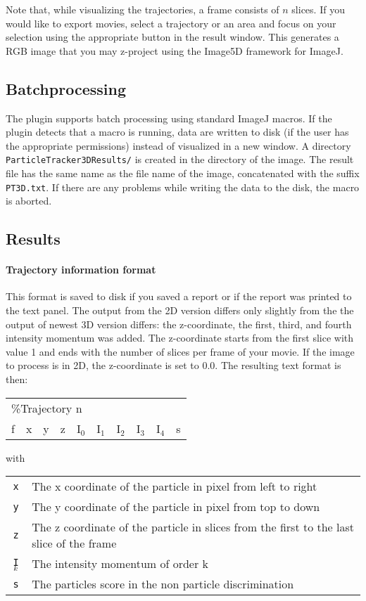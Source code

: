 \documentclass{scrartcl}
\begin{document}
Note that, while visualizing the trajectories, a frame consists of $n$ slices. If you would like to export movies, select a trajectory or an area and focus on your selection using the appropriate button in the result window. This generates  a RGB image that you may z-project using the Image5D framework for ImageJ.

\subsection{Batchprocessing}
The plugin supports batch processing using standard ImageJ macros. If the plugin detects that a macro is running, data are written to disk (if the user has the appropriate permissions) instead of visualized in a new window. A directory \texttt{ParticleTracker3DResults/} is created in the directory of the image. The result file has the same name as the file name of the image, concatenated with the suffix \texttt{PT3D.txt}. If there are any problems while writing the data to the disk, the macro is aborted.

\subsection{Results}
\label{sec:results}
\paragraph{Trajectory information format}
This format is saved to disk if you saved a report or if the report was printed to the text panel. The output from the 2D version differs only slightly from the the output of newest 3D version differs: the z-coordinate, the first, third, and fourth intensity momentum was added. The z-coordinate starts from the first slice with value 1 and ends with the number of slices per frame of your movie. If the image to process is in 2D, the z-coordinate is set to 0.0. The resulting text format is then:
\begin{table}[ht]
		\ttfamily
		\begin{tabular}{*{10}{l}}	
			\multicolumn{10}{l}{ \%Trajectory n} \\		
			f	&	x & y & z & I$_0$ & I$_1$ & I$_2$ & I$_3$ & I$_4$ & s					
		\end{tabular}
\end{table}

with
\begin{table}[ht]
	\centering
	\begin{tabular}{cp{10cm}}
		\texttt{x} & The x coordinate of the particle in pixel from left to right \\
		\texttt{y} & The y coordinate of the particle in pixel from top to down \\
		\texttt{z} & The z coordinate of the particle in slices from the first to the last slice of the frame\\
		\texttt{I}$_k$ & The intensity momentum of order k \\
		\texttt{s} & The particles score in the non particle discrimination \\
	\end{tabular}
\end{table}
\end{document}
